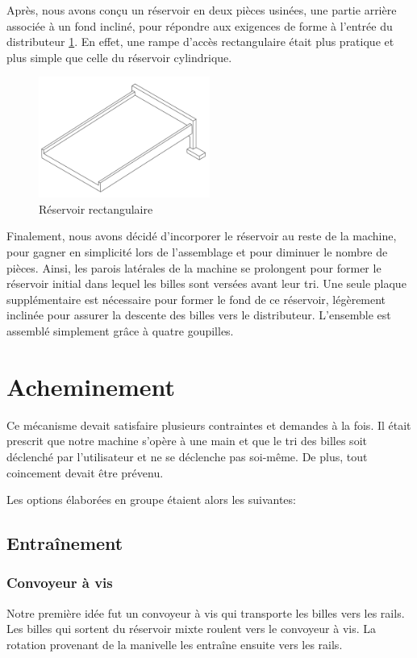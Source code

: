 Après, nous avons conçu un réservoir en deux pièces usinées, une partie arrière associée à un fond incliné, pour répondre aux exigences de forme à l'entrée du distributeur \ref{fig:res_rect}. En effet, une rampe d'accès rectangulaire était plus pratique et plus simple que celle du réservoir cylindrique.

\begin{figure}[htb]
    \centering
    \includegraphics[width=0.5\textwidth]{Graphics/Reservoir_initial/RESERVOIR_CUBE.pdf}
    \caption{Réservoir rectangulaire}
    \label{fig:res_rect}
\end{figure}

Finalement, nous avons décidé d'incorporer le réservoir au reste de la machine, pour gagner en simplicité lors de l'assemblage et pour diminuer le nombre de pièces. Ainsi, les parois latérales de la machine se prolongent pour former le réservoir initial dans lequel les billes sont versées avant leur tri. Une seule plaque supplémentaire est nécessaire pour former le fond de ce réservoir, légèrement inclinée pour assurer la descente des billes vers le distributeur. L'ensemble est assemblé simplement grâce à quatre goupilles. 

\section{Acheminement}
Ce mécanisme devait satisfaire plusieurs contraintes et demandes à la fois. Il était prescrit que notre machine s'opère à une main et que le tri des billes soit déclenché par l'utilisateur et ne se déclenche pas soi-même. De plus, tout coincement devait être prévenu.

Les options élaborées en groupe étaient alors les suivantes:

\subsection{Entraînement}

\subsubsection{Convoyeur à vis}
Notre première idée fut un convoyeur à vis qui transporte les billes vers les rails. Les billes qui sortent du réservoir mixte roulent vers le convoyeur à vis. La rotation provenant de la manivelle les entraîne ensuite vers les rails.

